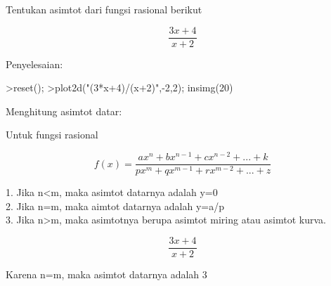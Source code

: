 \documentclass{article}
\begin{document}
\begin{eulernotebook}
\begin{eulercomment}
\begin{eulercomment}
\begin{eulercomment}
\begin{eulercomment}
\eulersubheading{}
\begin{eulercomment}
Tentukan asimtot dari fungsi rasional berikut\\
\end{eulercomment}
\begin{eulerformula}
\[
\frac{3x+4}{x+2}
\]
\end{eulerformula}
\begin{eulercomment}
Penyelesaian:
\end{eulercomment}
\begin{eulerprompt}
>reset();
>plot2d("(3*x+4)/(x+2)",-2,2); insimg(20)
\end{eulerprompt}
\begin{eulercomment}
Menghitung asimtot datar:

Untuk fungsi rasional\\
\end{eulercomment}
\begin{eulerformula}
\[
f(x)= \frac{ax^n+bx^{n-1}+cx^{n-2}+...+k}{px^m+qx^{m-1}+rx^{m-2}+...+z}
\]
\end{eulerformula}
\begin{eulercomment}
1. Jika n\textless{}m, maka asimtot datarnya adalah y=0\\
2. Jika n=m, maka aimtot datarnya adalah y=a/p\\
3. Jika n\textgreater{}m, maka asimtotnya berupa asimtot miring atau asimtot kurva.

\end{eulercomment}
\begin{eulerformula}
\[
\frac{3x+4}{x+2}
\]
\end{eulerformula}
\begin{eulercomment}
Karena n=m, maka asimtot datarnya adalah 3


\end{eulercomment}
\end{eulercomment}
\end{eulercomment}
\end{eulercomment}
\end{eulercomment}
\end{eulernotebook}
\end{document}
